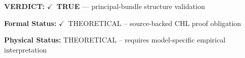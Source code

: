 \textbf{VERDICT:} \ensuremath{\checkmark}\ \textbf{TRUE} --- principal-bundle structure validation

\textbf{Formal Status:} \ensuremath{\checkmark}\ THEORETICAL -- source-backed CHL proof obligation

\textbf{Physical Status:} THEORETICAL -- requires model-specific empirical interpretation
\par\vspace{0.45em}
\par
\ifTZPDarkEdition
{}
\fi
\endgroup
\endgroup
